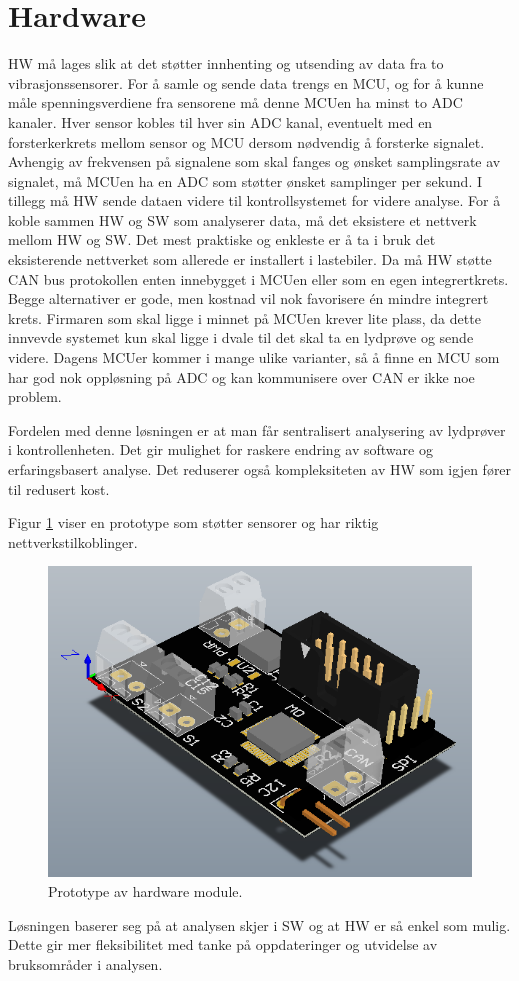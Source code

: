 \section{Hardware}

HW må lages slik at det støtter innhenting og utsending av data fra to vibrasjonssensorer. 
For å samle og sende data trengs en MCU, og for å kunne måle spenningsverdiene fra sensorene
må denne MCUen ha minst to ADC kanaler. Hver sensor kobles til hver sin ADC kanal, eventuelt
med en forsterkerkrets mellom sensor og MCU dersom nødvendig å forsterke signalet.
Avhengig av frekvensen på signalene som skal fanges og ønsket samplingsrate av signalet, må 
MCUen ha en ADC som støtter ønsket samplinger per sekund. I tillegg må HW sende dataen 
videre til kontrollsystemet for videre analyse. For å koble sammen HW og SW som analyserer data,
må det eksistere et nettverk mellom HW og SW. Det mest praktiske og enkleste er å ta i bruk det eksisterende
nettverket som allerede er installert i lastebiler. Da må HW støtte CAN bus protokollen enten innebygget
i MCUen eller som en egen integrertkrets. Begge alternativer er gode, men kostnad vil nok favorisere
én mindre integrert krets. Firmaren \cite{firmware} som skal ligge i minnet på MCUen krever lite plass, 
da dette innvevde systemet \cite{embedded} kun skal ligge i dvale til det skal ta en lydprøve og sende 
videre. Dagens MCUer kommer i mange
ulike varianter, så å finne en MCU som har god nok oppløsning på ADC og kan kommunisere over CAN
er ikke noe problem. 

Fordelen med denne løsningen er at man får sentralisert analysering av lydprøver i kontrollenheten.
Det gir mulighet for raskere endring av software og erfaringsbasert analyse. Det reduserer også kompleksiteten
av HW som igjen fører til redusert kost. 

Figur \ref{fig:hw} viser en prototype som støtter sensorer og har riktig nettverkstilkoblinger. 
\begin{figure}[H] \centering
\includegraphics[width=0.5 \textwidth]{images/eit_prototype.png}
\caption{Prototype av hardware module.}
\label{fig:hw}
\end{figure}
Løsningen baserer seg på at analysen skjer i SW og at HW er så enkel som mulig. Dette gir mer
fleksibilitet med tanke på oppdateringer og utvidelse av bruksområder i analysen.